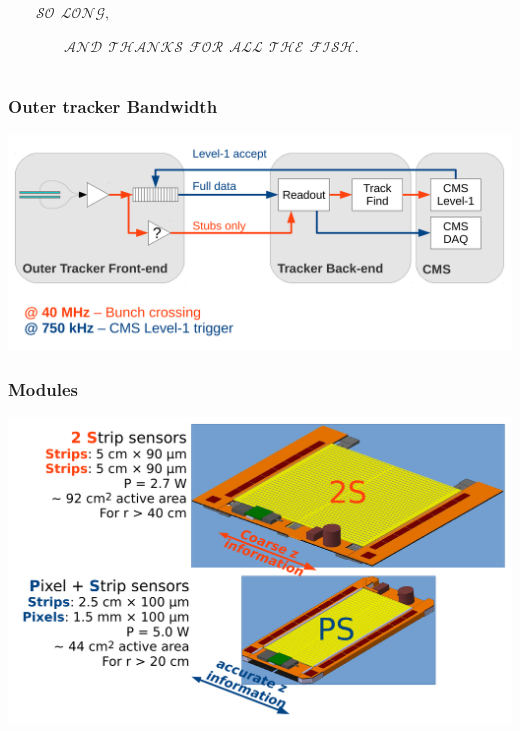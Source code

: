\documentclass[pdftex, 11pt]{beamer}
\begin{document}
\begin{frame}
  $\mathcal{\qquad SO\ \ LONG,}$
  \vspace{0.6cm}

  $\mathcal{\qquad \qquad AND\ \ THANKS\ \ FOR\ \ ALL\ \ THE\ \ FISH.}$
\end{frame}

\appendix

\section{\appendixname}

\begin{frame}[fragile]
  \frametitle{Outer tracker Bandwidth}
  \begin{center}
    \includegraphics[width=\textwidth]{img/bandwidth.pdf}
  \end{center}
\end{frame}

\begin{frame}
  \frametitle{Modules}
  \begin{center}
    \includegraphics[width=\textwidth]{img/modules.pdf}
  \end{center}
\end{frame}
\end{document}
